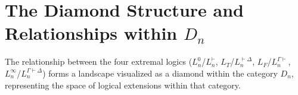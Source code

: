 \documentclass{article}
\newcommand{\LT}{L_T} %
\newcommand{\LF}{L_F} %
\begin{document}
																																																																											\section{The Diamond Structure and Relationships within $D_n$}
																																																																											
																																																																											The relationship between the four extremal logics ($L^0_n$/$L^{\vdash}_n$, $\LT$/$L^{\vdash\Delta}_n$, $\LF$/$L^{\Gamma\vdash}_n$, $L^\infty_n$/$L^{\Gamma\vdash\Delta}_n$) forms a landscape visualized as a diamond within the category $D_n$, representing the space of logical extensions within that category.
																																																																											
\end{document}
